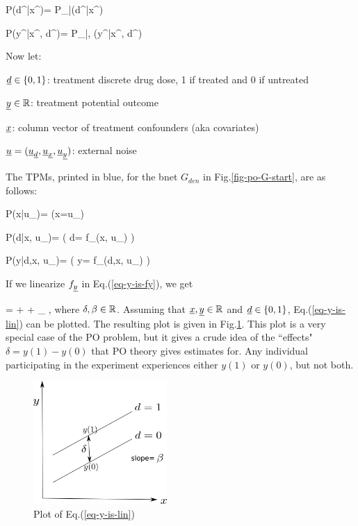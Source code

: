 \beq\color{blue}
P(d^\s|x^\s)=
P_{\rvd|\rvx}(d^\s|x^\s)
\eeq


\beq\color{blue}
P(y^\s|x^\s, d^\s)=
P_{\rvy|\rvx, \rvd}(y^\s|x^\s, d^\s)
\eeq




Now let:

${\underline{d}}\in\{0,1\}$: treatment discrete drug dose,  1 if treated and 0 if untreated

${\underline{y}}\in { \mathbb{R}}$:
 treatment potential outcome

${\underline{x}}$: column vector of 
treatment
confounders (aka covariates)


${\underline{u}}=({\underline{u}}_{\underline{d}}, {\underline{u}}_{\underline{x}}, {\underline{u}}_{\underline{y}})$:
external noise

The TPMs, printed in blue,
for the bnet
$G_{den}$
in Fig.\ref{fig-po-G-start},
are as follows:


\beq \color{blue}
P(x|u_\rvx)= \indi(\;\;x=u_\rvx\;\;)
\eeq

\beq\color{blue}
P(d|x, u_\rvd)=
\indi( \;\; d= f_\rvd(x, u_\rvd)
\;\;)
\eeq

\beq\color{blue}
P(y|d,x, u_\rvy)=
\indi( \;\; y= f_\rvy(d,x, u_\rvy)
\;\;)
\label{eq-y-is-fy}
\eeq

If we linearize
 $f_{\underline{y}}$ in Eq.(\ref{eq-y-is-fy}),
we get

\beqa
\rvy =
\delta \rvd + \beta \rvx + \rvu_\rvy
\;,
\label{eq-y-is-lin}
\eeqa
where $\delta, \beta\in { \mathbb{R}}$.
Assuming
that ${\underline{x}}, {\underline{y}}\in { \mathbb{R}}$
and ${\underline{d}}\in \{0,1\}$,
Eq.(\ref{eq-y-is-lin}) can be plotted.
The resulting plot
is given in Fig.\ref{fig-po-two-parallel-lines}.
This plot
is a very special
case of the PO problem,
but it gives a crude idea
of the ``effects" $\delta
= y(1)-y(0)$ that PO theory 
gives estimates for.
Any 
individual participating in the experiment
experiences either $y(1)$
or $y(0)$,
but not both.



\begin{figure}[h!]
\centering
\includegraphics[width=2in]
{pot-out/two-parallel-lines.png}
\caption{Plot  of
Eq.(\ref{eq-y-is-lin})} 
\label{fig-po-two-parallel-lines}
\end{figure}




